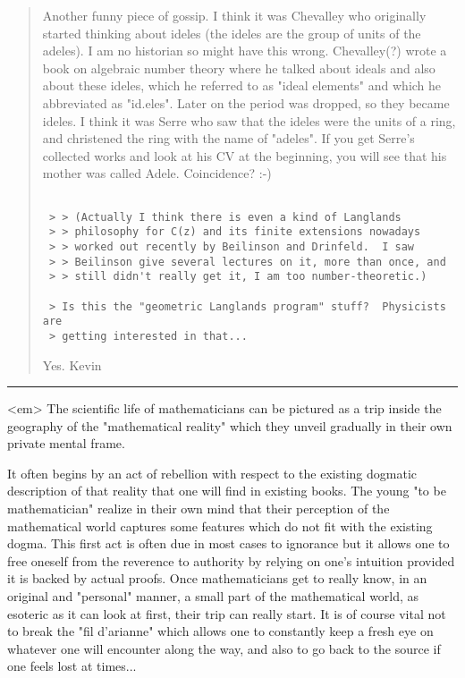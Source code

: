 \begin{quote}
 Another funny piece of gossip. I think it was Chevalley who originally
 started thinking about ideles (the ideles are the group of units
 of the adeles). I am no historian so might have this wrong. Chevalley(?)
 wrote a book on algebraic number theory where he talked about ideals
 and also about these ideles, which he referred to as "ideal elements"
 and which he abbreviated as "id.eles". Later on the period was dropped,
 so they became ideles. I think it was Serre who saw that the ideles
 were the units of a ring, and christened the ring with the name of "adeles".
 If you get Serre's collected works and look at his CV at the beginning,
 you will see that his mother was called Adele. Coincidence? :-)


\begin{verbatim}

 > > (Actually I think there is even a kind of Langlands 
 > > philosophy for C(z) and its finite extensions nowadays 
 > > worked out recently by Beilinson and Drinfeld.  I saw 
 > > Beilinson give several lectures on it, more than once, and
 > > still didn't really get it, I am too number-theoretic.)

 > Is this the "geometric Langlands program" stuff?  Physicists are
 > getting interested in that...
\end{verbatim}
    
 Yes.
 Kevin
\end{quote}


\par\noindent\rule{\textwidth}{0.4pt}
<em>
 The scientific life of mathematicians can be pictured as a trip
 inside the geography of the "mathematical reality" which
 they unveil gradually in their own private mental frame.

  It often begins by an act of rebellion with respect to the existing
 dogmatic description of that reality that one will find in existing
 books. The young "to be mathematician" realize in their own
 mind that their perception of the mathematical world captures some
 features which do not fit with the existing dogma.  This first act is
 often due in most cases to ignorance but it allows one to free
 oneself from the reverence to authority by relying on one's intuition
 provided it is backed by actual proofs. Once mathematicians get to
 really know, in an original and "personal" manner, a small
 part of the mathematical world, as esoteric as it can look at first,
 their trip can really start. It is of course vital not to break the
 "fil d'arianne" which allows one to constantly keep a fresh
 eye on whatever one will encounter along the way, and also to go back
 to the source if one feels lost at times...

